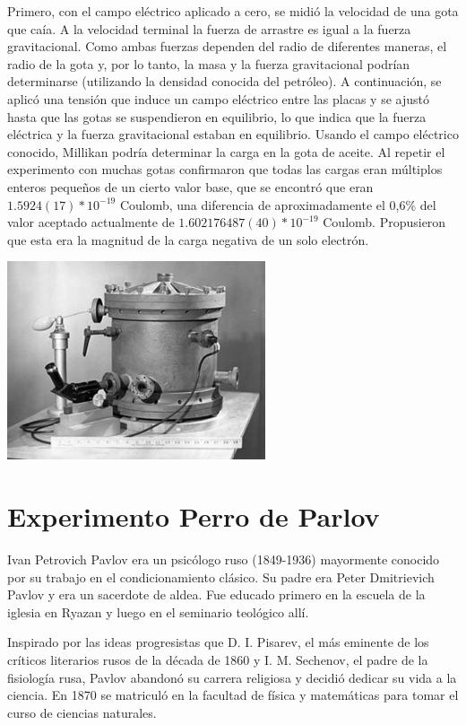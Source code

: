 \documentclass[letterpaper, 10pt, journal]{IEEEtran}
\begin{document}
Primero, con el campo eléctrico aplicado a cero, se midió la velocidad de una gota que caía. A la velocidad terminal la fuerza de arrastre es igual a la fuerza gravitacional. Como ambas fuerzas dependen del radio de diferentes maneras, el radio de la gota y, por lo tanto, la masa y la fuerza gravitacional podrían determinarse (utilizando la densidad conocida del petróleo). A continuación, se aplicó una tensión que induce un campo eléctrico entre las placas y se ajustó hasta que las gotas se suspendieron en equilibrio, lo que indica que la fuerza eléctrica y la fuerza gravitacional estaban en equilibrio. Usando el campo eléctrico conocido, Millikan podría determinar la carga en la gota de aceite. Al repetir el experimento con muchas gotas confirmaron que todas las cargas eran múltiplos enteros pequeños de un cierto valor base, que se encontró que eran $1.5924 (17) * 10^{-19}$ Coulomb, una diferencia de aproximadamente el 0,6\% del valor aceptado actualmente de $1.602176487 (40) * 10^{-19}$ Coulomb. Propusieron que esta era la magnitud de la carga negativa de un solo electrón.

\includegraphics[scale=1.5]{dropmethod2}

\section{Experimento Perro de Parlov}
Ivan Petrovich Pavlov era un psicólogo ruso (1849-1936) mayormente conocido por su trabajo en el condicionamiento clásico. Su padre era Peter Dmitrievich Pavlov y era un sacerdote de aldea. Fue educado primero en la escuela de la iglesia en Ryazan y luego en el seminario teológico allí.

Inspirado por las ideas progresistas que D. I. Pisarev, el más eminente de los críticos literarios rusos de la década de 1860 y I. M. Sechenov, el padre de la fisiología rusa, Pavlov abandonó su carrera religiosa y decidió dedicar su vida a la ciencia. En 1870 se matriculó en la facultad de física y matemáticas para tomar el curso de ciencias naturales.
\end{document}
